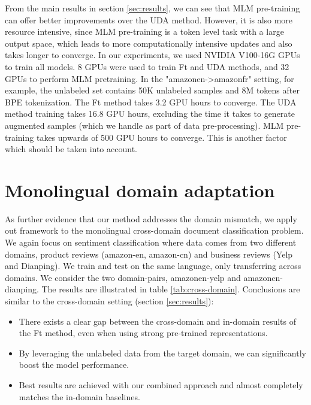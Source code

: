 \documentclass{article} \usepackage{iclr2020_conference,times}
\begin{document}
From the main results in section \ref{sec:results}, we can see that MLM pre-training can offer better improvements over the UDA method. However, it is also more resource intensive, since MLM pre-training is a token level task with a large output space, which leads to more computationally intensive updates and also takes longer to converge.
In our experiments, we used NVIDIA V100-16G GPUs to train all models. 8 GPUs were used to train Ft and UDA methods, and 32 GPUs to perform MLM pretraining. In the "amazonen->amazonfr" setting, for example, the unlabeled set contains 50K unlabeled samples and 8M tokens after BPE tokenization. The Ft method takes 3.2 GPU hours to converge. The UDA method training takes 16.8 GPU hours, excluding the time it takes to generate augmented samples (which we handle as part of data pre-processing). MLM pre-training takes upwards of 500 GPU hours to converge.  This is another factor which should be taken into account.


\section{Monolingual domain adaptation}

As further evidence that our method addresses the domain mismatch, we apply out framework to the monolingual cross-domain document classification problem. We again focus on sentiment classification where data comes from two different domains, product reviews (amazon-en, amazon-cn)  and business reviews (Yelp and Dianping). We train and test on the same language, only transferring across domains. We consider the two domain-pairs, amazonen-yelp and amazoncn-dianping. The results are illustrated in table \ref{tab:cross-domain}.  Conclusions are similar to the cross-domain setting (section \ref{sec:results}):
\begin{itemize}[leftmargin=*]
    \item There exists a clear gap between the cross-domain and in-domain results of the Ft method, even when using strong pre-trained representations. 
    \item By leveraging the unlabeled data from the target domain, we can significantly boost the model performance.
    \item Best results are achieved with our combined approach and almost completely matches the in-domain baselines.
\end{itemize}
\end{document}
